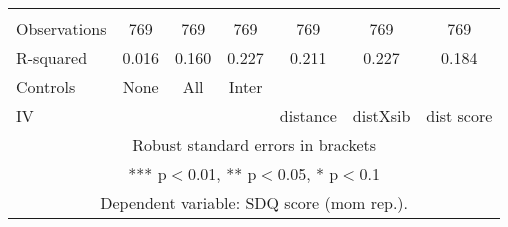 \begin{tabular}{lcccccc}
 &  &  &  &  &  &  \\
Observations & 769 & 769 & 769 & 769 & 769 & 769 \\
R-squared & 0.016 & 0.160 & 0.227 & 0.211 & 0.227 & 0.184 \\
Controls & None & All & Inter &  &  &  \\
 IV &  &  &  & distance & distXsib & dist score \\ \hline
\multicolumn{7}{c}{ Robust standard errors in brackets} \\
\multicolumn{7}{c}{ *** p$<$0.01, ** p$<$0.05, * p$<$0.1} \\
\multicolumn{7}{c}{ Dependent variable: SDQ score (mom rep.).} \\
\end{tabular}
